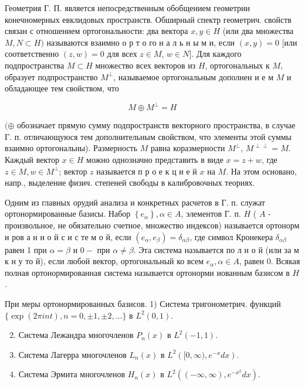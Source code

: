 \documentclass[10pt]{article}
\begin{document}
Геометрия Г. П. является непосредственным обобщением геометрии конечномерных евклидовых пространств. Обширный спектр геометрич. свойств связан с отношением ортогональности: два вектора $x, y \in H$ (или два множества $M, N \subset H)$ называются взаимно о р т о го н а л ь н ы м и, если $(x, y)=0$ [или соответственно $(z, w)=0$ для всех $z \in M$, $w \in N]$. Для каждого подпространства $M \subset H$ множество всех векторов из $H$, ортогональных к $M$, образует подпространство $M^{\perp}$, называемое ортогональным дополнен и е м $M$ и обладающее тем свойством, что



\[

M \oplus M^{\perp}=H

\]



$(\oplus$ обозначает прямую сумму подпространств векторного пространства, в случае Г. п. отличающуюся тем дополнительным свойством, что элементы этой суммы взаимно ортогональны). Размерность $M$ равна коразмерности $M^{\perp}$, $M^{\perp \perp}=M$. Каждый вектор $x \in H$ можно однозначно представить в виде $x=z+w$, где $z \in M, w \in M^{\perp}$; вектор $z$ называется п р о е к ц и е й $x$ на $M$. На этом основано, напр., выделение физич. степеней свободы в калибровочных теориях.



Одним из главных орудий анализа и конкретных расчетов в Г. п. служат ортонормированные базисы. Набор $\left\{e_{\alpha}\right\}, \alpha \in A$, элементов Г. п. $H$ ( $A$ - произвольное, не обязательно счетное, множество индексов) называется ортонорм и ров а н н о й с и с те м о й, если $\left(e_{\alpha}, e_{\beta}\right)=\delta_{\alpha \beta}$, где символ Кронекера $\delta_{\alpha \beta}$ равен 1 при $\alpha=\beta$ и $0-$ при $\alpha \neq \beta$. Эта система называется по л н о й (или за м к н у то й), если любой вектор, ортогональный ко всем $e_{\alpha}, \alpha \in A$, равен 0. Всякая полная ортонормированная система называется ортонорми иованным базисом в $H$.



При меры ортонормированных базисов. 1) Система тригонометрич. функций $\{\exp (2 \pi i n t), n=0, \pm 1, \pm 2, \ldots\}$ в $L^{2}(0,1)$.



\begin{enumerate}

  \setcounter{enumi}{1}

  \item Система Лежандра многочленов $P_{n}(x)$ в $L^{2}(-1,1)$.



  \item Система Лагерра многочленов $L_{n}(x)$ в $L^{2}\left([0, \infty), e^{-x} d x\right)$.



  \item Система Эрмита многочленов $H_{n}(x)$ в $L^{2}\left((-\infty, \infty), e^{-x^{2}} d x\right)$.



\end{enumerate}
\end{document}
